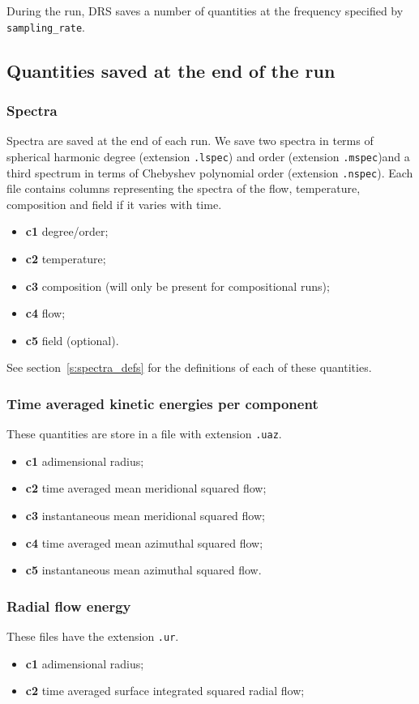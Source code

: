 \documentclass[a4paper,10pt]{book}
\begin{document}
During the run, DRS saves a number of quantities at the frequency specified by
\verb|sampling_rate|.

\subsection{Quantities saved at the end of the run}
\subsubsection{Spectra}
\label{s:spectra_files}
Spectra are saved at the end of each run. We save two spectra in terms of
spherical harmonic degree (extension \verb|.lspec|) and order (extension
\verb|.mspec|)and a third spectrum in terms of Chebyshev polynomial order
(extension \verb|.nspec|).
Each file contains columns representing the spectra of the flow, temperature, composition and
field if it varies with time.
\begin{itemize}
 \item{\bf c1} degree/order;
 \item{\bf c2} temperature;
 \item{\bf c3} composition (will only be present for compositional runs);
 \item{\bf c4} flow;
 \item{\bf c5} field (optional).
\end{itemize}
See section~\ref{s:spectra_defs} for the definitions of each of these
quantities.

\subsubsection{Time averaged kinetic energies per component}
These quantities are store in a file with extension \verb|.uaz|.
\begin{itemize}
 \item{\bf c1} adimensional radius;
 \item{\bf c2} time averaged mean meridional squared flow;
 \item{\bf c3} instantaneous mean meridional squared flow;
 \item{\bf c4} time averaged mean azimuthal squared flow;
 \item{\bf c5} instantaneous mean azimuthal squared flow.
\end{itemize}

\subsubsection{Radial flow energy}
These files have the extension \verb|.ur|.
\begin{itemize}
 \item{\bf c1} adimensional radius;
 \item{\bf c2} time averaged surface integrated squared radial flow;
\end{itemize}
\end{document}

